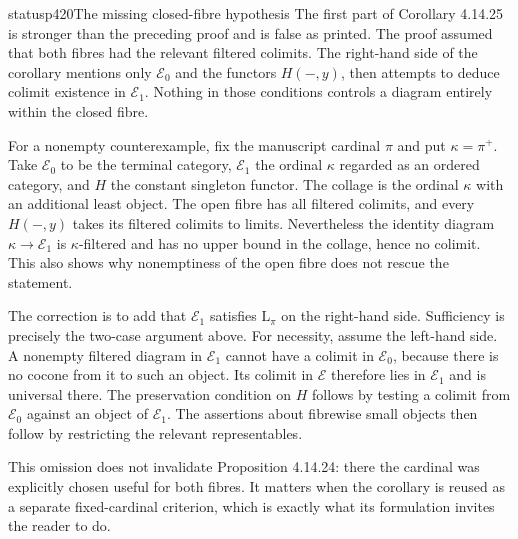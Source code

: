 \begin{dcomment}{status}{p420}{The missing closed-fibre hypothesis}
The first part of Corollary 4.14.25 is stronger than the preceding proof and is false as printed. The proof assumed that both fibres had the relevant filtered colimits. The right-hand side of the corollary mentions only $\mathcal E_0$ and the functors $H(-,y)$, then attempts to deduce colimit existence in $\mathcal E_1$. Nothing in those conditions controls a diagram entirely within the closed fibre.

For a nonempty counterexample, fix the manuscript cardinal $\pi$ and put $\kappa=\pi^+$. Take $\mathcal E_0$ to be the terminal category, $\mathcal E_1$ the ordinal $\kappa$ regarded as an ordered category, and $H$ the constant singleton functor. The collage is the ordinal $\kappa$ with an additional least object. The open fibre has all filtered colimits, and every $H(-,y)$ takes its filtered colimits to limits. Nevertheless the identity diagram $\kappa\to\mathcal E_1$ is $\kappa$-filtered and has no upper bound in the collage, hence no colimit. This also shows why nonemptiness of the open fibre does not rescue the statement.

The correction is to add that $\mathcal E_1$ satisfies $\mathrm L_\pi$ on the right-hand side. Sufficiency is precisely the two-case argument above. For necessity, assume the left-hand side. A nonempty filtered diagram in $\mathcal E_1$ cannot have a colimit in $\mathcal E_0$, because there is no cocone from it to such an object. Its colimit in $\mathcal E$ therefore lies in $\mathcal E_1$ and is universal there. The preservation condition on $H$ follows by testing a colimit from $\mathcal E_0$ against an object of $\mathcal E_1$. The assertions about fibrewise small objects then follow by restricting the relevant representables.

This omission does not invalidate Proposition 4.14.24: there the cardinal was explicitly chosen useful for both fibres. It matters when the corollary is reused as a separate fixed-cardinal criterion, which is exactly what its formulation invites the reader to do.
\end{dcomment}

